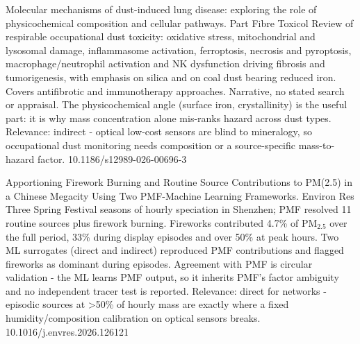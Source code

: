 \documentclass[10pt]{article}
\begin{document}
\par{}\baselineskip{}\baselineskip
{}

{Molecular mechanisms of dust-induced lung disease: exploring the role of physicochemical composition and cellular pathways.}
{Part Fibre Toxicol}
{Review of respirable occupational dust toxicity: oxidative stress, mitochondrial and lysosomal damage, inflammasome activation, ferroptosis, necrosis and pyroptosis, macrophage/neutrophil activation and NK dysfunction driving fibrosis and tumorigenesis, with emphasis on silica and on coal dust bearing reduced iron. Covers antifibrotic and immunotherapy approaches. Narrative, no stated search or appraisal. The physicochemical angle (surface iron, crystallinity) is the useful part: it is why mass concentration alone mis-ranks hazard across dust types. Relevance: indirect - optical low-cost sensors are blind to mineralogy, so occupational dust monitoring needs composition or a source-specific mass-to-hazard factor.}
{10.1186/s12989-026-00696-3}

\par{}\baselineskip{}\baselineskip
{}

{Apportioning Firework Burning and Routine Source Contributions to PM(2.5) in a Chinese Megacity Using Two PMF-Machine Learning Frameworks.}
{Environ Res}
{Three Spring Festival seasons of hourly speciation in Shenzhen; PMF resolved 11 routine sources plus firework burning. Fireworks contributed 4.7\% of PM$_{2.5}$ over the full period, 33\% during display episodes and over 50\% at peak hours. Two ML surrogates (direct and indirect) reproduced PMF contributions and flagged fireworks as dominant during episodes. Agreement with PMF is circular validation - the ML learns PMF output, so it inherits PMF's factor ambiguity and no independent tracer test is reported. Relevance: direct for networks - episodic sources at >50\% of hourly mass are exactly where a fixed humidity/composition calibration on optical sensors breaks.}
{10.1016/j.envres.2026.126121}
\end{document}
